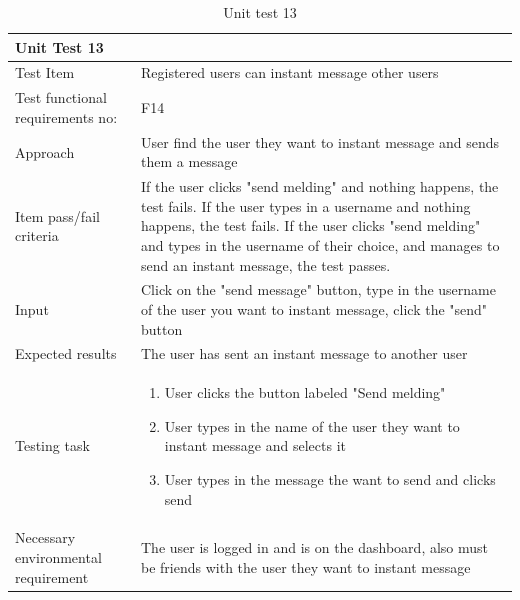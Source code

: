 \begin{table}[H]
\begin{tabular}{ | L{0.25\linewidth} | L{0.75\linewidth} | } 
 \hline {}
 Unit Test 13 &  \\
 \hline
 Test Item & Registered users can instant message other users\\
 \hline
 Test functional requirements no: & F14
 \\
 \hline
 Approach & User find the user they want to instant message and sends them a message\\
  \hline
 Item pass/fail criteria & If the user clicks "send melding" and nothing happens, the test fails. If the user types in a username and nothing happens, the test fails. If the user clicks "send melding" and types in the username of their choice, and manages to send an instant message, the test passes.\\
 \hline
 Input &  Click on the "send message" button, type in the username of the user you want to instant message, click the "send" button\\ 
 \hline
 Expected results & The user has sent an instant message to another user\\
  \hline
Testing task &
    \vspace{-5mm}
    \begin{enumerate}[noitemsep]
  \item User clicks the button labeled "Send melding"
  \item User types in the name of the user they want to instant message and selects it
  \item User types in the message the want to send and clicks send
   \end{enumerate}\\
 \hline
 Necessary environmental requirement & The user is logged in and is on the dashboard, also must be friends with the user they want to instant message\\
 \hline
\end{tabular}
\caption{Unit test 13}
\end{table}

